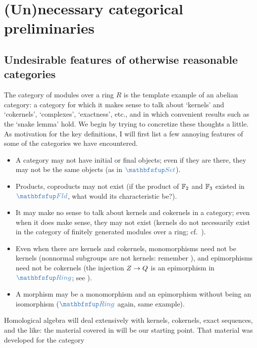 \section{(Un)necessary categorical preliminaries}
\label{sec:homol:un-necessary-categorical-preliminaries}


\subsection{Undesirable features of otherwise reasonable categories}
\label{subsec:homol:undesirable-features-of-otherwise-reasonable-categories}
The category of modules over a ring $R$ is the template example of an
abelian category: a category for which it makes sense to talk about
`kernels' and `cokernels', `complexes', `exactness', etc., and in
which convenient results such as the `snake lemma' hold. We begin by
trying to concretize these thoughts a little.  As motivation for the
key definitions, I will first list a few annoying features of some of
the categories we have encountered.
\begin{itemize}
\item A category may not have initial or final objects; even if they
  are there, they may not be the same objects (as in $\categ{Set}$).
\item Products, coproducts may not exist (if the product of $\mathbb{F}_2$ and
  $\mathbb{F}_3$ existed in $\categ{Fld}$, what would its characteristic be?).
\item It may make no sense to talk about kernels and cokernels in a
  category; even when it does make sense, they may not exist (kernels
  do not necessarily exist in the category of finitely generated
  modules over a ring; cf.\ ).
\item Even when there are kernels and cokernels, monomorphisms need
  not be kernels (nonnormal subgroups are not kernels: remember
  ), and epimorphisms need
  not be cokernels (the injection $Z \to Q$ is an epimorphism in
  $\categ{Ring}$; see
  ).
\item A morphism may be a monomorphism and an epimorphism without
  being an isomorphism ($\categ{Ring}$ again, same example).
\end{itemize}
Homological algebra will deal extensively with kernels, cokernels,
exact sequences, and the like: the material covered in
 will be our starting
point. That material was developed for the category
